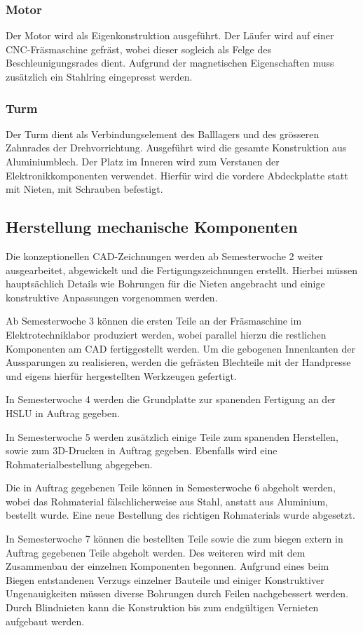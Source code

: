 \subsubsection{Motor}
Der Motor wird als Eigenkonstruktion ausgeführt. Der Läufer wird auf einer CNC-Fräsmaschine gefräst, wobei dieser sogleich als Felge des 
Beschleunigungsrades dient. Aufgrund der magnetischen Eigenschaften muss zusätzlich ein Stahlring eingepresst werden.

\subsubsection{Turm}
Der Turm dient als Verbindungselement des Balllagers und des grösseren 
Zahnrades der Drehvorrichtung. Ausgeführt wird die gesamte Konstruktion aus Aluminiumblech. Der Platz im Inneren wird zum Verstauen der 
Elektronikkomponenten verwendet. Hierfür wird die vordere Abdeckplatte statt mit Nieten, mit Schrauben befestigt.


\subsection{Herstellung mechanische Komponenten}
Die konzeptionellen CAD-Zeichnungen werden ab Semesterwoche 2 weiter 
ausgearbeitet, abgewickelt und die Fertigungszeichnungen erstellt. Hierbei müssen hauptsächlich Details wie Bohrungen für die Nieten angebracht und einige konstruktive Anpassungen vorgenommen werden. 

Ab Semesterwoche 3 können die ersten Teile an der Fräsmaschine im Elektrotechniklabor produziert werden, wobei parallel  hierzu die restlichen Komponenten am CAD fertiggestellt werden.
Um die gebogenen Innenkanten der Aussparungen zu realisieren, werden die gefrästen Blechteile mit der Handpresse und eigens hierfür hergestellten Werkzeugen gefertigt.

In Semesterwoche 4 werden die Grundplatte zur spanenden Fertigung an der HSLU in Auftrag gegeben.

In Semesterwoche 5 werden zusätzlich einige Teile zum spanenden Herstellen, sowie zum 3D-Drucken in Auftrag gegeben. Ebenfalls wird eine Rohmaterialbestellung abgegeben.

Die in Auftrag gegebenen Teile können in Semesterwoche 6 abgeholt werden, wobei das  Rohmaterial fälschlicherweise aus Stahl, anstatt aus Aluminium, bestellt wurde. Eine neue Bestellung des richtigen Rohmaterials wurde abgesetzt.

In Semesterwoche 7 können die bestellten Teile sowie die zum biegen extern in Auftrag gegebenen Teile abgeholt werden. Des weiteren wird mit dem Zusammenbau der einzelnen Komponenten begonnen. Aufgrund eines beim Biegen entstandenen Verzugs einzelner Bauteile und einiger Konstruktiver Ungenauigkeiten müssen diverse Bohrungen durch Feilen nachgebessert werden. Durch Blindnieten kann die Konstruktion bis zum endgültigen Vernieten aufgebaut werden.

